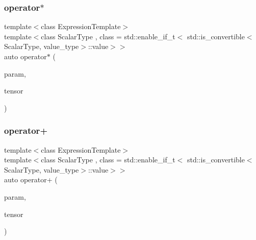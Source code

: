 \mbox{\label{classbc_1_1tensors_1_1Expression__Base_ad924afa898e9dd9f51d1677a334b0152}} 
\subsubsection{\texorpdfstring{operator$\ast$}{operator*}}
{\footnotesize\ttfamily template$<$class Expression\+Template$>$ \\
template$<$class Scalar\+Type , class  = std\+::enable\+\_\+if\+\_\+t$<$   std\+::is\+\_\+convertible$<$\+Scalar\+Type, value\+\_\+type$>$\+::value$>$$>$ \\
auto operator$\ast$ (\begin{DoxyParamCaption}\item[{const Scalar\+Type \&}]{param,  }\item[{const \hyperlink{classbc_1_1tensors_1_1Expression__Base}{Expression\+\_\+\+Base}$<$ Expression\+Template $>$ \&}]{tensor }\end{DoxyParamCaption})\hspace{0.3cm}{\ttfamily [friend]}}

\mbox{\label{classbc_1_1tensors_1_1Expression__Base_aca6a969e8c10f3e2d08c61d0d6f8358c}} 
\subsubsection{\texorpdfstring{operator+}{operator+}}
{\footnotesize\ttfamily template$<$class Expression\+Template$>$ \\
template$<$class Scalar\+Type , class  = std\+::enable\+\_\+if\+\_\+t$<$   std\+::is\+\_\+convertible$<$\+Scalar\+Type, value\+\_\+type$>$\+::value$>$$>$ \\
auto operator+ (\begin{DoxyParamCaption}\item[{const Scalar\+Type \&}]{param,  }\item[{const \hyperlink{classbc_1_1tensors_1_1Expression__Base}{Expression\+\_\+\+Base}$<$ Expression\+Template $>$ \&}]{tensor }\end{DoxyParamCaption})\hspace{0.3cm}{\ttfamily [friend]}}


